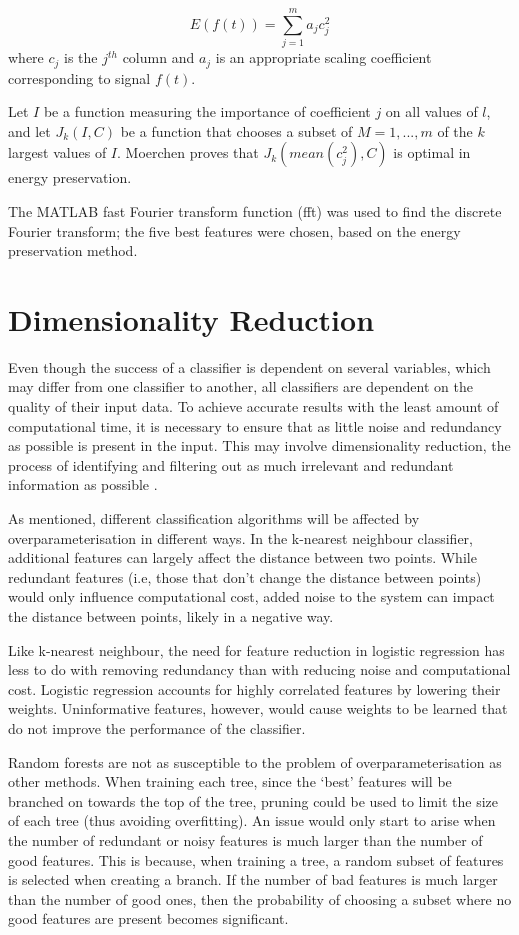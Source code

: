 \[E(f(t))=\sum_{j=1}^ma_jc^2_j\] 
where $c_j$ is the $j^{th}$ column and $a_j$ is an appropriate scaling coefficient corresponding to signal $f(t)$. 

Let $I$ be a function measuring the importance of coefficient $j$ on all values of $l$, and let $J_k(I,C)$ be a function that chooses a subset of $M = {1, ..., m}$ of the $k$ largest values of $I$. Moerchen \cite{Moerchen} proves that $J_k(mean(c_j^2),C)$ is optimal in energy preservation.

The MATLAB fast Fourier transform function (fft) was used to find the discrete Fourier transform; the five best features were chosen, based on the energy preservation method.


		
\section{Dimensionality Reduction}
\label{sec:dimensionalityReduction}

Even though the success of a classifier is dependent on several variables, which may differ from one classifier to another, all classifiers are dependent on the quality of their input data. To achieve accurate results with the least amount of computational time, it is necessary to ensure that as little noise and redundancy as possible is present in the input. This may involve dimensionality reduction, the process of identifying and filtering out as much irrelevant and redundant information as possible \cite{Hall}. 

As mentioned, different classification algorithms will be affected by overparameterisation in different ways. In the k-nearest neighbour classifier, additional features can largely affect the distance between two points. While redundant features (i.e, those that don't change the distance between points) would only influence computational cost, added noise to the system can impact the distance between points, likely in a negative way. 

Like k-nearest neighbour, the need for feature reduction in logistic regression has less to do with removing redundancy than with reducing noise and computational cost. Logistic regression accounts for highly correlated features by lowering their weights. Uninformative features, however, would cause weights to be learned that do not improve the performance of the classifier. 

Random forests are not as susceptible to the problem of overparameterisation as other methods. When training each tree, since the `best' features will be branched on towards the top of the tree, pruning could be used to limit the size of each tree (thus avoiding overfitting). An issue would only start to arise when the number of redundant or noisy features is much larger than the number of good features. This is because, when training a tree, a random subset of features is selected when creating a branch. If the number of bad features is much larger than the number of good ones, then the probability of choosing a subset where no good features are present becomes significant.

